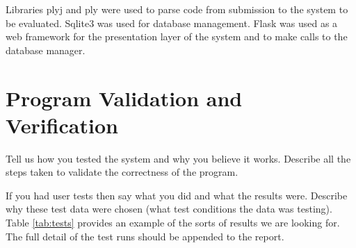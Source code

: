\documentclass[11pt,a4paper]{article}
\begin{document}
Libraries plyj and  ply were used to parse code from submission to the system to be evaluated. Sqlite3 was used for database management. Flask was used as a web framework for the presentation layer of the system and to make calls to the database manager.


\section{Program Validation and Verification}
\label{ss:progr-valid-verif}

Tell us how you tested the system and why you believe it works.
Describe all the steps taken to validate the correctness of the
program.

If you had user tests then say what you did and what the results
were. Describe why these test data were chosen (what test conditions
the data was testing).  Table \ref{tab:tests} provides an example of
the sorts of results we are looking for. The full detail of the test
runs should be appended to the report.
\end{document}
